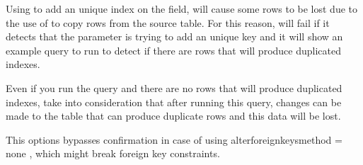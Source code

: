\documentclass[letterpaper,10pt,english]{sphinxmanual}
\begin{document}
\begin{fulllineitems}
\sphinxAtStartPar
Using  to add an unique index on the  field, will cause some rows to
be lost due to the use of  to copy rows from the source table.
For this reason,  will fail if it detects that the {\hyperref[\detokenize{mariadb-schema-change:cmdoption-mariadb-schema-change-alter}]{}} parameter is trying
to add an unique key and it will show an example query to run to detect if there are
rows that will produce duplicated indexes.

\sphinxAtStartPar
Even if you run the query and there are no rows that will produce duplicated indexes,
take into consideration that after running this query, changes can be made to the table that can produce
duplicate rows and this data will be lost.

\end{fulllineitems}


\begin{fulllineitems}
\label{\detokenize{mariadb-schema-change:cmdoption-mariadb-schema-change-force}}
\sphinxAtStartPar
This options bypasses confirmation in case of using alter\sphinxhyphen{}foreign\sphinxhyphen{}keys\sphinxhyphen{}method = none , which might break foreign key constraints.

\end{fulllineitems}

\end{document}
